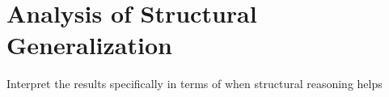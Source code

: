 \chapter{Analysis of Structural Generalization}
Interpret the results specifically in terms of when structural reasoning helps
\label{chap:generalization}